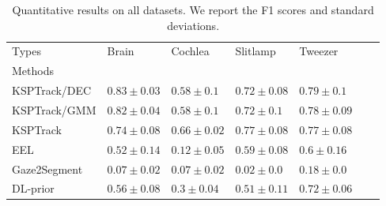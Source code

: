 \begin{table}
\centering
\caption{
Quantitative results on all datasets. We report the F1 scores and standard deviations.
}
\label{tab:results}
\begin{tabular}{llp{1.8cm}p{1.8cm}p{1.8cm}p{1.8cm}p{1.8cm}}
\toprule
Types &                 Brain &               Cochlea &              Slitlamp &              Tweezer \\
Methods      &                       &                       &                       &                      \\
\midrule
KSPTrack/DEC &  $\bm{0.83} \pm 0.03$ &        $0.58 \pm 0.1$ &       $0.72 \pm 0.08$ &  $\bm{0.79} \pm 0.1$ \\
KSPTrack/GMM &       $0.82 \pm 0.04$ &        $0.58 \pm 0.1$ &        $0.72 \pm 0.1$ &      $0.78 \pm 0.09$ \\
\hdashline
KSPTrack     &       $0.74 \pm 0.08$ &  $\bm{0.66} \pm 0.02$ &  $\bm{0.77} \pm 0.08$ &      $0.77 \pm 0.08$ \\
EEL          &       $0.52 \pm 0.14$ &       $0.12 \pm 0.05$ &       $0.59 \pm 0.08$ &       $0.6 \pm 0.16$ \\
Gaze2Segment &       $0.07 \pm 0.02$ &       $0.07 \pm 0.02$ &        $0.02 \pm 0.0$ &       $0.18 \pm 0.0$ \\
DL-prior     &       $0.56 \pm 0.08$ &        $0.3 \pm 0.04$ &       $0.51 \pm 0.11$ &      $0.72 \pm 0.06$ \\
\bottomrule
\end{tabular}
\end{table}
